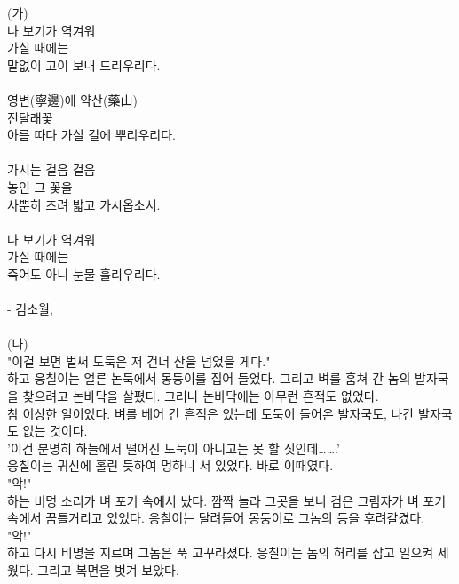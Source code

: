 \documentclass[11pt,a4paper]{article}
\begin{document}
\begin{tcolorbox}[passage]
(가) \\{}
나 보기가 역겨워 \\{}
가실 때에는 \\{}
말없이 고이 보내 드리우리다. \\{}
\vspace{4pt} \\{}
영변(寧邊)에 약산(藥山) \\{}
진달래꽃 \\{}
아름 따다 가실 길에 뿌리우리다. \\{}
\vspace{4pt} \\{}
가시는 걸음 걸음 \\{}
놓인 그 꽃을 \\{}
사뿐히 즈려 밟고 가시옵소서. \\{}
\vspace{4pt} \\{}
나 보기가 역겨워 \\{}
가실 때에는 \\{}
죽어도 아니 눈물 흘리우리다. \\{}
\vspace{4pt} \\{}
- 김소월,  \\{}
\vspace{4pt} \\{}
(나) \\{}
"이걸 보면 벌써 도둑은 저 건너 산을 넘었을 게다." \\{}
하고 응칠이는 얼른 논둑에서 몽둥이를 집어 들었다. 그리고 벼를 훔쳐 간 놈의 발자국을 찾으려고 논바닥을 살폈다. 그러나 논바닥에는 아무런 흔적도 없었다. \\{}
참 이상한 일이었다. 벼를 베어 간 흔적은 있는데 도둑이 들어온 발자국도, 나간 발자국도 없는 것이다. \\{}
'이건 분명히 하늘에서 떨어진 도둑이 아니고는 못 할 짓인데…….' \\{}
응칠이는 귀신에 홀린 듯하여 멍하니 서 있었다. 바로 이때였다. \\{}
"악!" \\{}
하는 비명 소리가 벼 포기 속에서 났다. 깜짝 놀라 그곳을 보니 검은 그림자가 벼 포기 속에서 꿈틀거리고 있었다. 응칠이는 달려들어 몽둥이로 그놈의 등을 후려갈겼다. \\{}
"악!" \\{}
하고 다시 비명을 지르며 그놈은 푹 고꾸라졌다. 응칠이는 놈의 허리를 잡고 일으켜 세웠다. 그리고 복면을 벗겨 보았다. \\{}

\end{tcolorbox}
\end{document}
